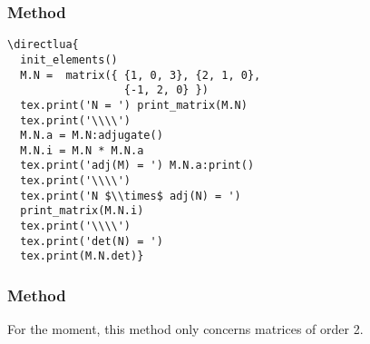 \subsubsection{Method }
\label{ssub:method_adjugate}

\begin{minipage}{.6\textwidth}
\begin{verbatim}
\directlua{
  init_elements()
  M.N =  matrix({ {1, 0, 3}, {2, 1, 0},
                  {-1, 2, 0} })
  tex.print('N = ') print_matrix(M.N)
  tex.print('\\\\')
  M.N.a = M.N:adjugate()
  M.N.i = M.N * M.N.a
  tex.print('adj(M) = ') M.N.a:print()
  tex.print('\\\\')
  tex.print('N $\\times$ adj(N) = ')
  print_matrix(M.N.i)
  tex.print('\\\\')
  tex.print('det(N) = ')
  tex.print(M.N.det)}
\end{verbatim}
\end{minipage}
\begin{minipage}{.4\textwidth}
\end{minipage}
\newpage


\subsubsection{Method }
\label{ssub:diagonalization}

For the moment, this method only concerns matrices of order 2.

